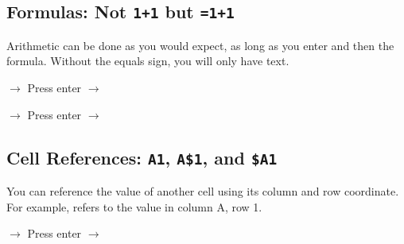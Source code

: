 \subsection{Formulas: Not \texttt{1+1} but \texttt{=1+1}}


Arithmetic can be done as you would expect, as long as you enter \code{=} and then the formula. Without the equals sign, you will only have text. 

\medskip 


\begin{center}
 $\rightarrow$  Press enter $\rightarrow$ 

 $\rightarrow$  Press enter $\rightarrow$ 
\end{center}






\subsection{Cell References: \texttt{A1}, \texttt{A\$1}, and \texttt{\$A1}}

You can reference the value of another cell using its column and row coordinate. For example,  refers to the value in column A, row 1. 

\begin{center}
 $\rightarrow$  Press enter $\rightarrow$ 
\end{center}


